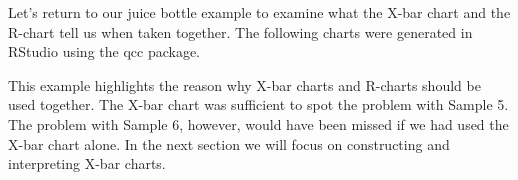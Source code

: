 \documentclass{ximera}
\begin{document}
Let's return to our juice bottle example to examine what the X-bar chart and the R-chart tell us when taken together.  The following charts were generated in RStudio using the qcc package.

\begin{center}
       \end{center}

This example highlights the reason why X-bar charts and R-charts should be used together.  The X-bar chart was sufficient to spot the problem with Sample 5.  The problem with Sample 6, however, would have been missed if we had used the X-bar chart alone.  In the next section we will focus on constructing and interpreting X-bar charts.
\end{document}
